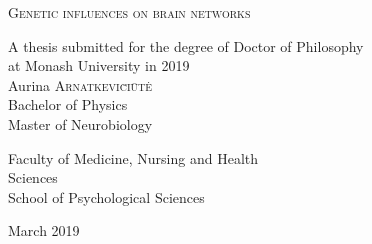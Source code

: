\thispagestyle{empty}
\begin{center}

\begin{center}
\end{center}

\parbox{150mm}{\fontsize{24.88}{24.88}\bf\centering 

             \textsc{Genetic influences on brain networks }}
              
\fontsize{16}{25}


{\Large A thesis submitted for the degree of Doctor of Philosophy} \\
{\Large at Monash University in 2019}\\


{\Large Aurina \textsc{Arnatkevi\u{c}i\={u}t\.{e}}}\\
Bachelor of Physics\\Master of Neurobiology

{\Large Faculty of Medicine, Nursing and Health }\\
{\Large Sciences\\School of Psychological Sciences}


{March 2019}

\end{center}

\clearpage \thispagestyle{empty} \cleardoublepage 
